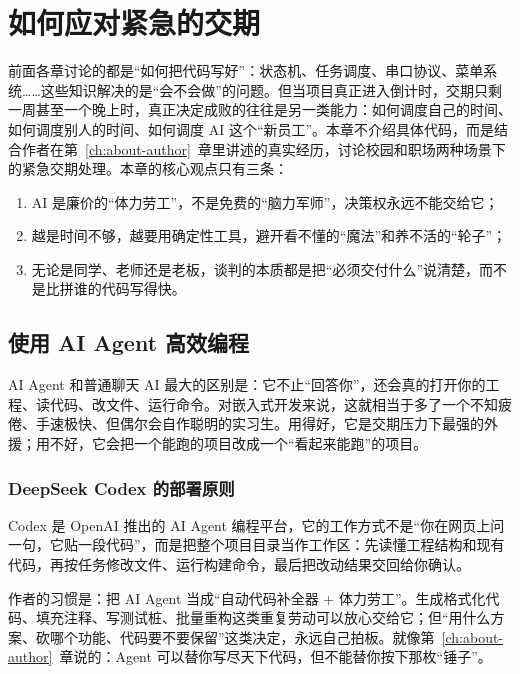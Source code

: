 \chapter{如何应对紧急的交期} \label{ch:deadline-ai}

前面各章讨论的都是“如何把代码写好”：状态机、任务调度、串口协议、菜单系统……这些知识解决的是“会不会做”的问题。但当项目真正进入倒计时，交期只剩一周甚至一个晚上时，真正决定成败的往往是另一类能力：如何调度自己的时间、如何调度别人的时间、如何调度 AI 这个“新员工”。本章不介绍具体代码，而是结合作者在第~\ref{ch:about-author}~章里讲述的真实经历，讨论校园和职场两种场景下的紧急交期处理。本章的核心观点只有三条：
\begin{enumerate}
\item AI 是廉价的“体力劳工”，不是免费的“脑力军师”，决策权永远不能交给它；
\item 越是时间不够，越要用确定性工具，避开看不懂的“魔法”和养不活的“轮子”；
\item 无论是同学、老师还是老板，谈判的本质都是把“必须交付什么”说清楚，而不是比拼谁的代码写得快。
\end{enumerate}

\section{使用 AI Agent 高效编程}

AI Agent 和普通聊天 AI 最大的区别是：它不止“回答你”，还会真的打开你的工程、读代码、改文件、运行命令。对嵌入式开发来说，这就相当于多了一个不知疲倦、手速极快、但偶尔会自作聪明的实习生。用得好，它是交期压力下最强的外援；用不好，它会把一个能跑的项目改成一个“看起来能跑”的项目。

\subsection{DeepSeek Codex 的部署原则}

Codex 是 OpenAI 推出的 AI Agent 编程平台，它的工作方式不是“你在网页上问一句，它贴一段代码”，而是把整个项目目录当作工作区：先读懂工程结构和现有代码，再按任务修改文件、运行构建命令，最后把改动结果交回给你确认。

作者的习惯是：把 AI Agent 当成“自动代码补全器 + 体力劳工”。生成格式化代码、填充注释、写测试桩、批量重构这类重复劳动可以放心交给它；但“用什么方案、砍哪个功能、代码要不要保留”这类决定，永远自己拍板。就像第~\ref{ch:about-author}~章说的：Agent 可以替你写尽天下代码，但不能替你按下那枚“锤子”。

